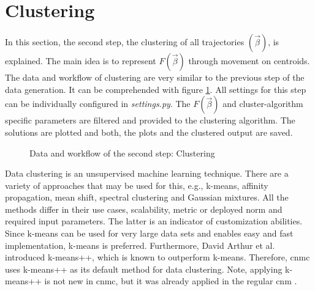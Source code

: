\section{Clustering}
\label{sec_2_3_Clustering}
In this section, the second step, the clustering of all trajectories $(\vec{\beta})$, is explained. 
The main idea is to represent $F(\vec{\beta})$ through movement on centroids.
The data and workflow of clustering are very similar to the previous step of the data generation. It can be comprehended with figure \ref{fig_12_Clust}.
All settings for this step can be individually configured in \emph{settings.py}.
The $ F(\vec{\beta})$ and cluster-algorithm specific parameters are filtered and provided to the clustering algorithm. The solutions are plotted and both, the plots and the clustered output are saved.\newline 

\begin{figure} [!h]
    \hspace*{-4cm} 
    \resizebox{1.2\textwidth}{!}{
    
    }
    \caption{Data and workflow of the second step: Clustering}
    \label{fig_12_Clust}
\end{figure}
%
%

Data clustering is an unsupervised machine learning technique. 
There are a variety of approaches that may be used for this, e.g., 
k-means, affinity propagation, mean shift, 
spectral clustering and Gaussian mixtures. All the 
methods differ in their use cases, scalability,  
metric or deployed norm and required input parameters. The latter 
is an indicator of customization abilities. Since k-means can be used for very large
data sets and enables easy and fast implementation, k-means is preferred. Furthermore, David Arthur et al. 
\cite{Arthur2006} introduced k-means++, which is known 
to outperform k-means. Therefore, \gls{cnmc} uses k-means++ 
as its default method for data clustering. 
Note, applying k-means++ is not new in \gls{cnmc}, but it was already applied in the regular \gls{cnm} \cite{Fernex2021}.\newline

